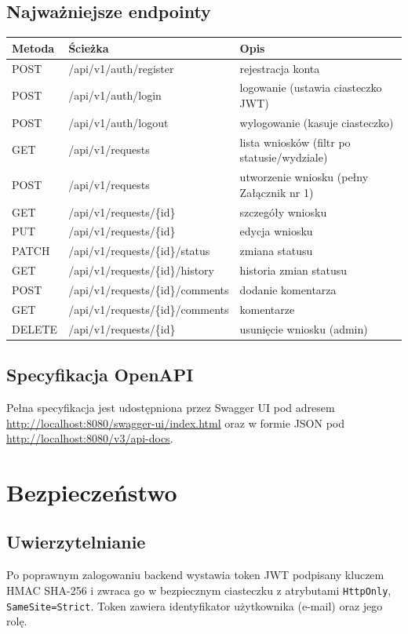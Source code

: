 \documentclass[12pt,a4paper]{article}
\begin{document}
\subsection{Najważniejsze endpointy}
\begin{tabularx}{\textwidth}{l l X}
  \toprule
  \textbf{Metoda} & \textbf{Ścieżka} & \textbf{Opis} \\
  \midrule
  POST & /api/v1/auth/register & rejestracja konta \\
  POST & /api/v1/auth/login & logowanie (ustawia ciasteczko JWT) \\
  POST & /api/v1/auth/logout & wylogowanie (kasuje ciasteczko) \\
  GET  & /api/v1/requests & lista wniosków (filtr po statusie/wydziale) \\
  POST & /api/v1/requests & utworzenie wniosku (pełny Załącznik nr 1) \\
  GET  & /api/v1/requests/\{id\} & szczegóły wniosku \\
  PUT  & /api/v1/requests/\{id\} & edycja wniosku \\
  PATCH & /api/v1/requests/\{id\}/status & zmiana statusu \\
  GET  & /api/v1/requests/\{id\}/history & historia zmian statusu \\
  POST & /api/v1/requests/\{id\}/comments & dodanie komentarza \\
  GET  & /api/v1/requests/\{id\}/comments & komentarze \\
  DELETE & /api/v1/requests/\{id\} & usunięcie wniosku (admin) \\
  \bottomrule
\end{tabularx}

\subsection{Specyfikacja OpenAPI}
Pełna specyfikacja jest udostępniona przez Swagger UI pod adresem
\url{http://localhost:8080/swagger-ui/index.html} oraz w formie JSON pod
\url{http://localhost:8080/v3/api-docs}.

\section{Bezpieczeństwo}
\label{sec:bezp}

\subsection{Uwierzytelnianie}
Po poprawnym zalogowaniu backend wystawia token JWT podpisany kluczem HMAC SHA-256
i zwraca go w bezpiecznym ciasteczku z atrybutami \texttt{HttpOnly}, \texttt{SameSite=Strict}.
Token zawiera identyfikator użytkownika (e-mail) oraz jego rolę.
\end{document}
